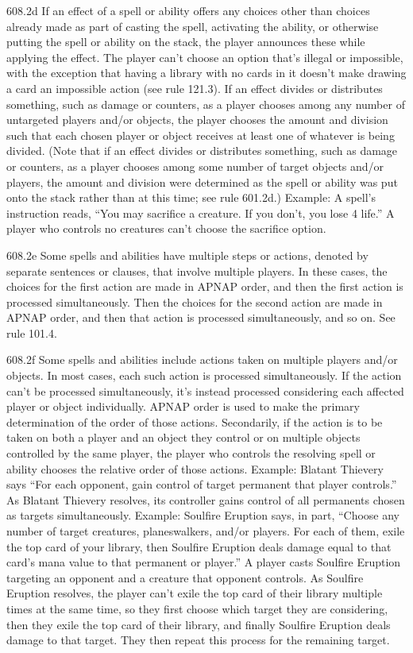 608.2d If an effect of a spell or ability offers any choices other than choices already made as part of casting the spell, activating the ability, or otherwise putting the spell or ability on the stack, the player announces these while applying the effect. The player can’t choose an option that’s illegal or impossible, with the exception that having a library with no cards in it doesn’t make drawing a card an impossible action (see rule 121.3). If an effect divides or distributes something, such as damage or counters, as a player chooses among any number of untargeted players and/or objects, the player chooses the amount and division such that each chosen player or object receives at least one of whatever is being divided. (Note that if an effect divides or distributes something, such as damage or counters, as a player chooses among some number of target objects and/or players, the amount and division were determined as the spell or ability was put onto the stack rather than at this time; see rule 601.2d.)
Example: A spell’s instruction reads, “You may sacrifice a creature. If you don’t, you lose 4 life.” A player who controls no creatures can’t choose the sacrifice option.

608.2e Some spells and abilities have multiple steps or actions, denoted by separate sentences or clauses, that involve multiple players. In these cases, the choices for the first action are made in APNAP order, and then the first action is processed simultaneously. Then the choices for the second action are made in APNAP order, and then that action is processed simultaneously, and so on. See rule 101.4.

608.2f Some spells and abilities include actions taken on multiple players and/or objects. In most cases, each such action is processed simultaneously. If the action can’t be processed simultaneously, it’s instead processed considering each affected player or object individually. APNAP order is used to make the primary determination of the order of those actions. Secondarily, if the action is to be taken on both a player and an object they control or on multiple objects controlled by the same player, the player who controls the resolving spell or ability chooses the relative order of those actions.
Example: Blatant Thievery says “For each opponent, gain control of target permanent that player controls.” As Blatant Thievery resolves, its controller gains control of all permanents chosen as targets simultaneously.
Example: Soulfire Eruption says, in part, “Choose any number of target creatures, planeswalkers, and/or players. For each of them, exile the top card of your library, then Soulfire Eruption deals damage equal to that card’s mana value to that permanent or player.” A player casts Soulfire Eruption targeting an opponent and a creature that opponent controls. As Soulfire Eruption resolves, the player can’t exile the top card of their library multiple times at the same time, so they first choose which target they are considering, then they exile the top card of their library, and finally Soulfire Eruption deals damage to that target. They then repeat this process for the remaining target.

